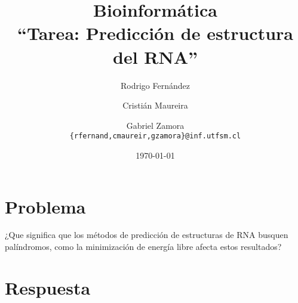 \documentclass[letter, 10pt]{article}
\begin{document}



\title{Bioinformática\\``Tarea: Predicción de estructura del RNA''}
\author{
Rodrigo Fernández \and Cristián Maureira \and Gabriel Zamora\\
\hspace{-8.5cm}		\texttt{\{rfernand,cmaureir,gzamora\}@inf.utfsm.cl}
}

\date{\today}
\maketitle

\section{Problema}
¿Que significa que los métodos de predicción de estructuras de RNA busquen
palíndromos, como la minimización de energía libre afecta estos resultados?


\section{Respuesta}
\end{document}
